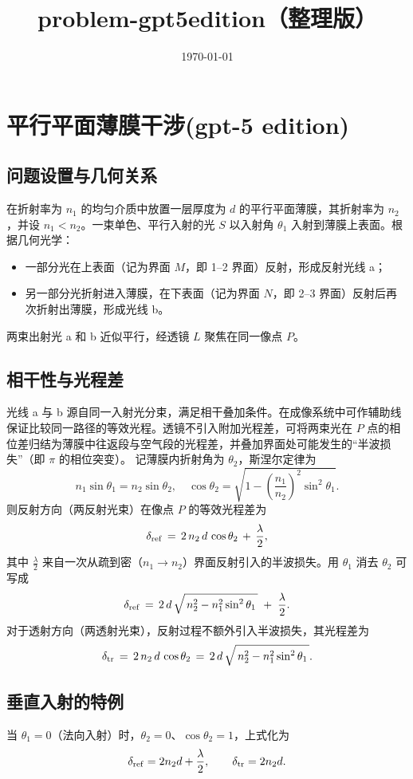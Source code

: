 \documentclass{ctexart}
\title{problem-gpt5edition（整理版）}
\author{ }
\date{\today}
\begin{document}
\maketitle

\section{平行平面薄膜干涉(gpt-5 edition)}
\subsection{问题设置与几何关系}
在折射率为 \(n_1\) 的均匀介质中放置一层厚度为 \(d\) 的平行平面薄膜，其折射率为 \(n_2\)，并设 \(n_1<n_2\)。一束单色、平行入射的光 \(S\) 以入射角 \(\theta_1\) 入射到薄膜上表面。根据几何光学：
\begin{itemize}
    \item 一部分光在上表面（记为界面 \(M\)，即 1--2 界面）反射，形成反射光线 a；
    \item 另一部分光折射进入薄膜，在下表面（记为界面 \(N\)，即 2--3 界面）反射后再次折射出薄膜，形成光线 b。
\end{itemize}
两束出射光 a 和 b 近似平行，经透镜 \(L\) 聚焦在同一像点 \(P\)。

\subsection{相干性与光程差}
光线 a 与 b 源自同一入射光分束，满足相干叠加条件。在成像系统中可作辅助线保证比较同一路径的等效光程。透镜不引入附加光程差，可将两束光在 \(P\) 点的相位差归结为薄膜中往返段与空气段的光程差，并叠加界面处可能发生的“半波损失”（即 \(\pi\) 的相位突变）。
记薄膜内折射角为 \(\theta_2\)，斯涅尔定律为
\[
    n_1\sin\theta_1=n_2\sin\theta_2,\quad \cos\theta_2=\sqrt{1-\left(\frac{n_1}{n_2}\right)^2\sin^2\theta_1}.
\]
则反射方向（两反射光束）在像点 \(P\) 的等效光程差为
\[
    \delta_{\rm ref} \,=\, 2\,n_2\,d\,\cos\theta_2 \, + \, \frac{\lambda}{2},
\]
其中 \(\tfrac{\lambda}{2}\) 来自一次从疏到密（\(n_1\to n_2\)）界面反射引入的半波损失。用 \(\theta_1\) 消去 \(\theta_2\) 可写成
\[
    \delta_{\rm ref} \,=\, 2\,d\,\sqrt{\,n_2^2 - n_1^2\sin^2\theta_1\,}\; +\; \frac{\lambda}{2}.
\]
对于透射方向（两透射光束），反射过程不额外引入半波损失，其光程差为
\[
    \delta_{\rm tr} \,=\, 2\,n_2\,d\,\cos\theta_2 \,=\, 2\,d\,\sqrt{\,n_2^2 - n_1^2\sin^2\theta_1\,}.
\]

\subsection{垂直入射的特例}
当 \(\theta_1=0\)（法向入射）时，\(\theta_2=0\)、\(\cos\theta_2=1\)，上式化为
\[
    \delta_{\rm ref}=2n_2d+\frac{\lambda}{2},\qquad \delta_{\rm tr}=2n_2d.
\]
\end{document}
